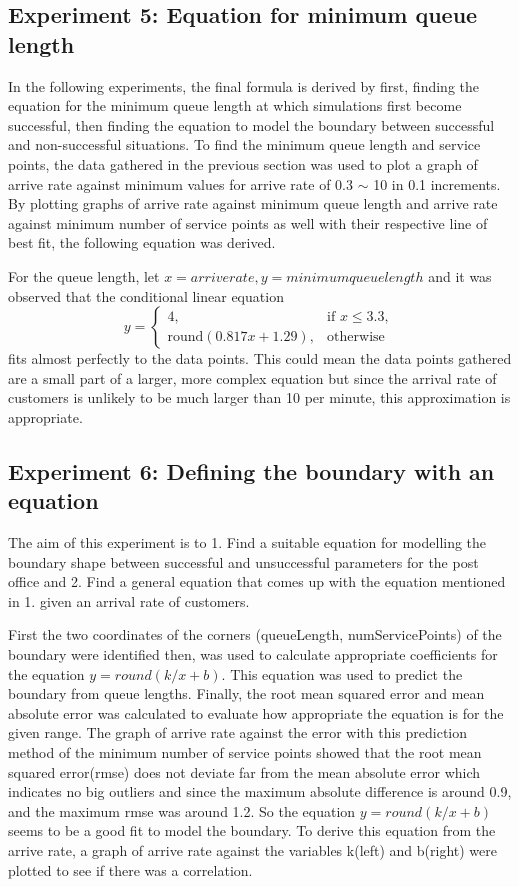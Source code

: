 \documentclass{article}
\begin{document}
\subsection{Experiment 5: Equation for minimum queue length}
In the following experiments, the final formula is derived by first, finding the equation for the minimum queue length at which simulations first become successful, then finding the equation to model the boundary between successful and non-successful situations.
To find the minimum queue length and service points, the data gathered in the previous section was used to plot a graph of arrive rate against minimum values for arrive rate of 0.3 $\sim$ 10 in 0.1 increments. By plotting graphs of arrive rate against minimum queue length and arrive rate against minimum number of service points as well with their respective line of best fit, the following equation was derived.

For the queue length, let \(x=arrive rate, y=minimum queue length\) and it was observed that the conditional linear equation
\[
y = 
\begin{cases}
    4, & \text{if } x \leq 3.3,\\
    \text{round}(0.817x + 1.29), & \text{otherwise}
\end{cases}
\]
fits almost perfectly to the data points. This could mean the data points gathered are a small part of a larger, more complex equation but since the arrival rate of customers is unlikely to be much larger than 10 per minute, this approximation is appropriate.

\subsection{Experiment 6: Defining the boundary with an equation}
The aim of this experiment is to 1. Find a suitable equation for modelling the boundary shape between successful and unsuccessful parameters for the post office and 2. Find a general equation that comes up with the equation mentioned in 1. given an arrival rate of customers.

First the two coordinates of the corners (queueLength, numServicePoints) of the boundary were identified then, was used to calculate appropriate coefficients for the equation \(y=round(k/x+b)\). This equation was used to predict the boundary from queue lengths. Finally, the root mean squared error and mean absolute error was calculated to evaluate how appropriate the equation is for the given range. The graph of arrive rate against the error with this prediction method of the minimum number of service points showed that the root mean squared error(rmse) does not deviate far from the mean absolute error which indicates no big outliers and since the maximum absolute difference is around 0.9, and the maximum rmse was around 1.2. So the equation \(y=round(k/x+b)\) seems to be a good fit to model the boundary.
To derive this equation from the arrive rate, a graph of arrive rate against the variables k(left) and b(right) were plotted to see if there was a correlation.
\end{document}
